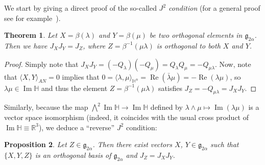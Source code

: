 \documentclass[12pt, a4paper,draft]{amsart}
\newcommand{\g}{\mathfrak}
\newcommand{\R}{\mathbb{R}}
\renewcommand{\H}{\mathbb{H}}
\renewcommand{\Re}{\operatorname{Re}}
\renewcommand{\Im}{\operatorname{Im}}
\newtheorem{theorem}{Theorem}[section]
\newtheorem{proposition}[theorem]{Proposition}
\theoremstyle{remark}
\begin{document}
We start by giving a direct proof of the so-called \textit{$J^2$ condition} (for a general proof see for example~\cite[Theorem~8.5]{CowlingDooleyKoranyiRicci}).
\begin{theorem}
	Let $X=\beta(\lambda)$ and $Y=\beta(\mu)$ be two orthogonal elements in $\g{g}_{2\alpha}$.
	Then we have $J_{X}J_{Y}=J_{Z}$, where $Z=\beta^{-1}(\mu\lambda)$ is orthogonal to both $X$ and $Y$.
\end{theorem}
\begin{proof}
	Simply note that $J_{X}J_{Y}=(-Q_{\lambda})(-Q_{\mu})=Q_{\lambda}Q_{\mu}=-Q_{\mu\lambda}$.
	Now, note that $\langle X,Y\rangle_{AN}=0$ implies that $0=\langle \lambda,\mu\rangle_{\H^n}=\Re(\bar{\lambda}\mu)=-\Re(\lambda\mu)$, so $\lambda\mu\in\Im\H$ and thus the element $Z=\beta^{-1}(\mu\lambda)$ satisfies $J_{Z}=-Q_{\mu\lambda}=J_{X}J_{Y}$.
\end{proof}

Similarly, because the map $\bigwedge^2\Im\H\to\Im\H$ defined by $\lambda\wedge\mu\mapsto\Im(\lambda\mu)$ is a vector space isomorphism (indeed, it coincides with the usual cross product of $\Im\H\equiv\R^{3}$), we deduce a ``reverse'' $J^{2}$ condition:
\begin{proposition}
	Let $Z\in\g{g}_{2\alpha}$.
	Then there exist vectors $X$, $Y\in\g{g}_{2\alpha}$ such that $\{X,Y,Z\}$ is an orthogonal basis of $\g{g}_{2\alpha}$ and $J_{Z}=J_{X}J_{Y}$.
\end{proposition}
\end{document}
